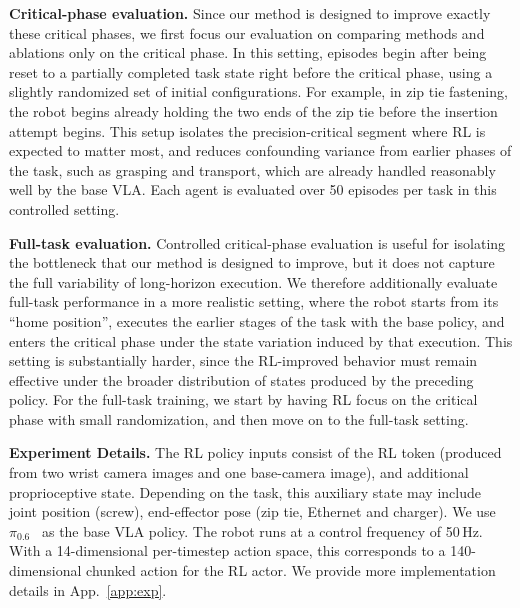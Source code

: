 \textbf{Critical-phase evaluation.}\quad
Since our method is designed to improve exactly these critical phases, we first focus our evaluation on comparing methods and ablations only on the critical phase. In this setting, episodes begin after being reset to a partially completed task state right before the critical phase, using a slightly randomized set of initial configurations. For example, in zip tie fastening, the robot begins already holding the two ends of the zip tie before the insertion attempt begins. This setup isolates the precision-critical segment where RL is expected to matter most, and reduces confounding variance from earlier phases of the task, such as grasping and transport, which are already handled reasonably well by the base VLA. Each agent is evaluated over 50 episodes per task in this controlled setting.

\textbf{Full-task evaluation.}\quad
Controlled critical-phase evaluation is useful for isolating the bottleneck that our method is designed to improve, but it does not capture the full variability of long-horizon execution. We therefore additionally evaluate full-task performance in a more realistic setting, where the robot starts from its ``home position'', executes the earlier stages of the task with the base policy, and enters the critical phase under the state variation induced by that execution. This setting is substantially harder, since the RL-improved behavior must remain effective under the broader distribution of states produced by the preceding policy. For the full-task training, we start by having RL focus on the critical phase with small randomization, and then move on to the full-task setting.

\textbf{Experiment Details.}\quad
The RL policy inputs consist of the RL token (produced from two wrist camera images and one base-camera image), and additional proprioceptive state. Depending on the task, this auxiliary state may include joint position (screw), end-effector pose (zip tie, Ethernet and charger). We use $\pi_{0.6}$~\cite{pi06_model_card} as the base VLA policy. The robot runs at a control frequency of 50\,Hz. With a 14-dimensional per-timestep action space, this corresponds to a 140-dimensional chunked action for the RL actor. We provide more implementation details in App.~\ref{app:exp}. 


